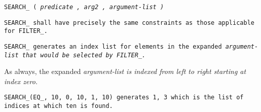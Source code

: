 
\tt{SEARCH_ (} \it{predicate} \tt{,} \it{arg2} \tt{,} \it{argument-list} \tt{)}


\tt{SEARCH_} shall have precisely the same
constraints as those applicable for \tt{FILTER_}.


\tt{SEARCH_} generates an index list for elements in the expanded
\it{argument-list} that would be selected by \tt{FILTER_}.

\note As always, the expanded \it{argument-list} is
indexed from left to right starting at index zero.

\example \tt{SEARCH_(EQ_, 10, 0, 10, 1, 10)} generates
\tt{1, 3} which is the list of indices at which ten is found.
